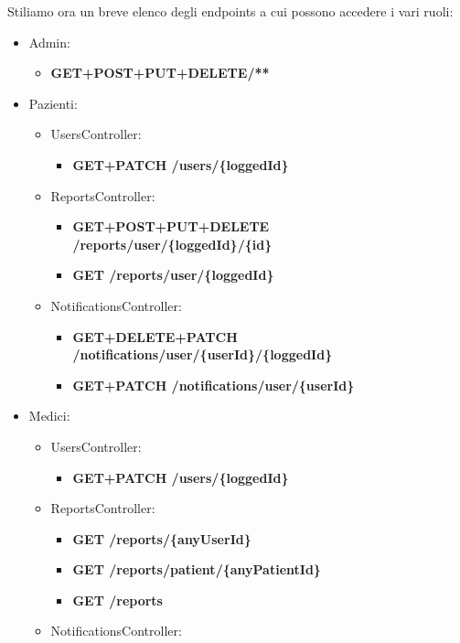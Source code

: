 \documentclass[a4paper]{article}
\begin{document}
Stiliamo ora un breve elenco degli endpoints a cui possono accedere i vari ruoli:
\begin{itemize}
  \item Admin:
  \begin{itemize}
    \item \textbf{GET+POST+PUT+DELETE/**}
  \end{itemize}
  \item Pazienti:
  \begin{itemize}
    \item UsersController: 
    \begin{itemize}
      \item \textbf{GET+PATCH /users/\{loggedId\}}
    \end{itemize}
    \item ReportsController: \begin{itemize}
      \item \textbf{GET+POST+PUT+DELETE /reports/user/\{loggedId\}/\{id\}}
      \item \textbf{GET /reports/user/\{loggedId\}}
    \end{itemize}
    \item NotificationsController: 
    \begin{itemize}
      \item \textbf{GET+DELETE+PATCH /notifications/user/\{userId\}/\{loggedId\}}
      \item \textbf{GET+PATCH /notifications/user/\{userId\}}
    \end{itemize}
  \end{itemize}
  \item Medici:
  \begin{itemize}
    \item UsersController:
    \begin{itemize}
      \item \textbf{GET+PATCH /users/\{loggedId\}} 
    \end{itemize}
    \item ReportsController:
    \begin{itemize}
      \item \textbf{GET /reports/\{anyUserId\}}
      \item \textbf{GET /reports/patient/\{anyPatientId\}}
      \item \textbf{GET /reports}
    \end{itemize}
    \item NotificationsController:
    \begin{itemize}

\end{itemize}
\end{itemize}
\end{itemize}
\end{document}
